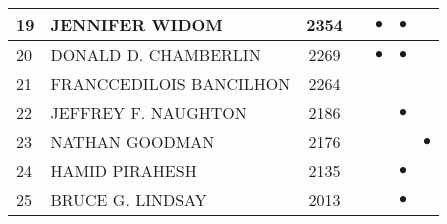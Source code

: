 \documentclass[12pt,titlepage]{report}
\begin{document}
\begin{center}
\begin{tabular}{|l|l|c|c|c|c|c|}
\hline
19 & JENNIFER WIDOM & 2354         &         &$\bullet$&$\bullet$&         \\
\hline
20 & DONALD D. CHAMBERLIN & 2269   &         &$\bullet$&$\bullet$&         \\
\hline
21 & FRANCCEDILOIS BANCILHON & 2264&         &         &         &         \\
\hline
22 & JEFFREY F. NAUGHTON & 2186    &         &         &$\bullet$&         \\
\hline
23 & NATHAN GOODMAN & 2176         &         &         &         &$\bullet$\\
\hline
24 & HAMID PIRAHESH & 2135         &         &         &$\bullet$&         \\
\hline
25 & BRUCE G. LINDSAY & 2013       &         &         &$\bullet$&         \\
\hline
\end{tabular}
\end{center}
\end{document}
